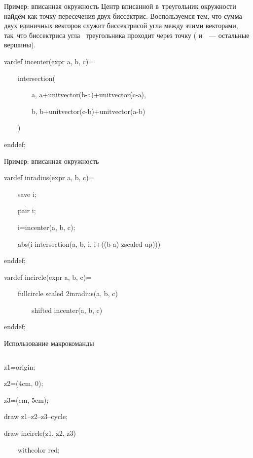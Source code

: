 
\begin{frame}{Пример: вписанная окружность}
Центр вписанной в~треугольник окружности найдём как точку пересечения двух
биссектрис. Воспользуемся тем, что сумма двух единичных векторов служит
биссектрисой угла между этими векторами, так~что биссектриса угла~
треугольника проходит через точку 
( и~~— остальные вершины).
\begin{programlisting}
vardef incenter(expr a, b, c)=\par
~~~~intersection(\par
~~~~~~~~a, a+unitvector(b-a)+unitvector(c-a),\par
~~~~~~~~b, b+unitvector(c-b)+unitvector(a-b)\par
~~~~)\par
enddef;
\end{programlisting}
\end{frame}


\begin{frame}{Пример: вписанная окружность}
\begin{programlisting}
vardef inradius(expr a, b, c)=\par
~~~~save i;\par
~~~~pair i;\par
~~~~i=incenter(a, b, c);\par
~~~~abs(i-intersection(a, b, i, i+((b-a) zscaled up)))\par
enddef;
\end{programlisting}

\begin{programlisting}
vardef incircle(expr a, b, c)=\par
~~~~fullcircle scaled 2inradius(a, b, c)\par
~~~~~~~~shifted incenter(a, b, c)\par
enddef;
\end{programlisting}
\end{frame}


\begin{frame}{Использование макрокоманды }
\begin{columns}
\begin{programlisting}
z1=origin;\par
z2=(4cm, 0);\par
z3=(cm, 5cm);\par
draw z1--z2--z3--cycle;\par
draw incircle(z1, z2, z3)\par
~~~~withcolor red;
\end{programlisting}
\end{columns}
\end{frame}

